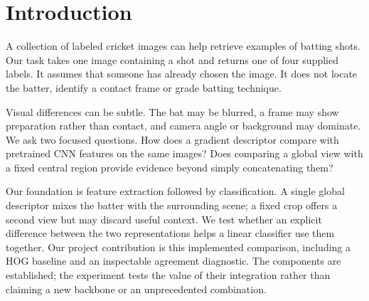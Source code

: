\begin{abstract}
We study a small, practical task: classify one cricket image as drive, leg glance/flick, pull or sweep. We compare a hand-crafted histogram of oriented gradients (HOG) with frozen MobileNetV2 features followed by a linear classifier. Our implemented extension combines global and fixed regional CNN features with their absolute difference, and exposes disagreement between separate view classifiers. On an unchanged test set of 945 images in 70 visual groups, HOG obtains 35.3\% accuracy and 34.5\% macro F1; the global CNN obtains 63.0\% and 62.9\%. Contrast obtains 65.5\% and 64.9\%, only three additional correct predictions over concatenation. Group-based uncertainty does not establish a clear advantage. A duplicate audit substantially reduces the optimistic preliminary result, and temperature scaling worsens test calibration. We report these limitations alongside a local demo and reproducible predictions. The study is exploratory because grouping was revised after earlier evaluation.
\end{abstract}

\section{Introduction}
A collection of labeled cricket images can help retrieve examples of batting shots. Our task takes one image containing a shot and returns one of four supplied labels. It assumes that someone has already chosen the image. It does not locate the batter, identify a contact frame or grade batting technique.

Visual differences can be subtle. The bat may be blurred, a frame may show preparation rather than contact, and camera angle or background may dominate. We ask two focused questions. How does a gradient descriptor compare with pretrained CNN features on the same images? Does comparing a global view with a fixed central region provide evidence beyond simply concatenating them?

Our foundation is feature extraction followed by classification. A single global descriptor mixes the batter with the surrounding scene; a fixed crop offers a second view but may discard useful context. We test whether an explicit difference between the two representations helps a linear classifier use them together. Our project contribution is this implemented comparison, including a HOG baseline and an inspectable agreement diagnostic. The components are established; the experiment tests the value of their integration rather than claiming a new backbone or an unprecedented combination.

